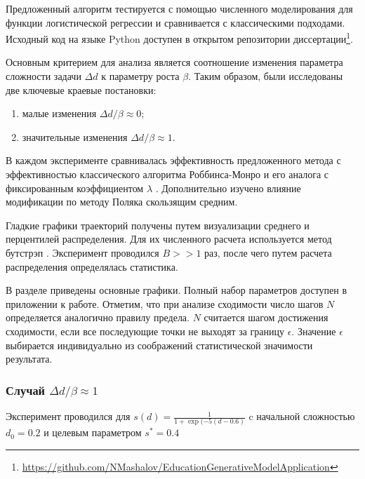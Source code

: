 Предложенный алгоритм тестируется с помощью численного моделирования для функции логистической регрессии и 
сравнивается с классическими подходами.
Исходный код на языке Python доступен в открытом репозитории диссертации\footnote{\url{https://github.com/NMashalov/EducationGenerativeModelApplication}}.

Основным критерием для анализа является соотношение изменения параметра сложности задачи $\Delta d$ к параметру роста ${\beta}$.
Таким образом, были исследованы две ключевые краевые постановки: \begin{enumerate}
    \item малые изменения  $\Delta d / \beta \approx 0$;
    \item значительные изменения $\Delta d / \beta \approx 1$.
\end{enumerate}
В каждом эксперименте сравнивалась эффективность предложенного метода с эффективностью классического алгоритма Роббинса-Монро и его аналога с 
фиксированным коэффициентом $\lambda$ \cite{yazidi2020balanced}. Дополнительно изучено влияние модификации по методу Поляка скользящим средним. 

Гладкие графики траекторий получены путем визуализации среднего и перцентилей распределения. Для их численного расчета используется метод бутстрэп \cite{efron1994introduction}. 
Эксперимент проводился $B >> 1$ раз, после чего путем расчета распределения определялась статистика.   

В разделе приведены основные графики. Полный набор параметров доступен в приложении к работе. Отметим, что при анализе сходимости число шагов $N$ определяется
 аналогично правилу предела. $N$ считается шагом достижения сходимости, если все последующие точки не выходят за границу $\epsilon$.  Значение $\epsilon$ 
 выбирается индивидуально из соображений статистической значимости результата. 

\subsubsection{Случай $\Delta d / \beta \approx 1$ }
Эксперимент проводился для $s(d) = \frac{1}{1+\exp(-5(d-0.6)} $ c начальной сложностью $d_0 =0.2$ и целевым параметром $s^* =0.4$

